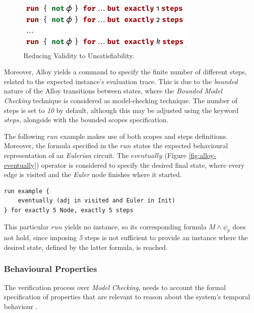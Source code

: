 \begin{figure}[H]
    \centering
    \includegraphics[width=0.5\linewidth]{images/check_alloy_2.png}
    \caption{Reducing Validity to Unsatisfiability.}
    \label{fig:alloy-check-2}
\end{figure}

Moreover, Alloy yields a command to specify the finite number of different steps, related to the expected instance's evaluation trace. This is due to the \textit{bounded} nature of the Alloy transitions between states, where the \textit{Bounded Model Checking} technique is considered as model-checking technique. The number of steps is set to \textit{10} by default, although this may be adjusted using the keyword $steps$, alongside with the bounded scopes specification. 

The following $run$ example makes use of both scopes and steps definitions. Moreover, the formula specified in the $run$ states the expected behavioural representation of an \textit{Eulerian} circuit. The $eventually$ (Figure \ref{fig:alloy-eventually}) operator is considered to specify the desired final state, where every edge is visited and the \textit{Euler} node finishes where it started.

\begin{lstlisting}[title={Bounded Model Checking: Eventually the graph will represent an \textit{Eulerian} circuit.}, otherkeywords = {run, eventually, in, and, for, exactly, \5, steps}, floatplacement=H]
run example {
    eventually (adj in visited and Euler in Init)
} for exactly 5 Node, exactly 5 steps
\end{lstlisting}

This particular $run$ yields no instance, so its corresponding formula $M \wedge \psi_{p}$ does not hold, since imposing \textit{5} steps is not sufficient to provide an instance where the desired state, defined by the latter formula, is reached.


\subsubsection{Behavioural Properties}

The verification process over \textit{Model Checking}, needs to account the formal specification of properties that are relevant to reason about the system's temporal behaviour \cite{baier2008principles} .

